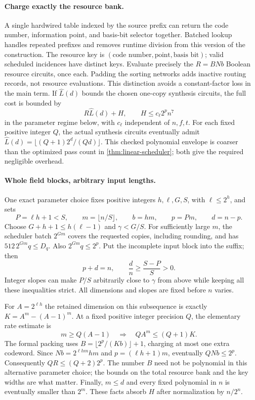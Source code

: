 \documentclass[11pt]{article}
\begin{document}
\paragraph{Charge exactly the resource bank.}
A single hardwired table indexed by the source prefix can return the code
number, information point, and basis-bit selector together.  Batched lookup
handles repeated prefixes and removes runtime division from this version of
the construction.  The resource key is
$(\text{code number},\text{point},\text{basis bit})$; valid scheduled
incidences have distinct keys.  Evaluate precisely the $R=BNb$ Boolean
resource circuits, once each.  Padding the sorting networks adds inactive
routing records, not resource evaluations.  This distinction avoids a
constant-factor loss in the main term.  If $\widehat L(d)$ bounds the chosen
one-copy synthesis circuits, the full cost is bounded by
\[
  R\widehat L(d)+H,\qquad H\le c_\ell 2^p n^7
\]
in the parameter regime below, with $c_\ell$ independent of $n,f,t$.
For each fixed positive integer $Q$, the actual synthesis circuits eventually
admit $\widehat L(d)=\lfloor(Q+1)2^d/(Qd)\rfloor$.
This checked polynomial envelope is coarser than the optimized pass count
in \cref{thm:linear-scheduler}; both give the required negligible overhead.

\paragraph{Whole field blocks, arbitrary input lengths.}
One exact parameter choice fixes positive integers $h,\ell,G,S$, with
$\ell\le2^h$, and sets
\[
  P=\ell h+1<S,\qquad
  m=\lfloor n/S\rfloor,\qquad b=hm,\qquad p=Pm,\qquad d=n-p.
\]
Choose $G+h+1\le h(\ell-1)$ and $\gamma<G/S$.
For sufficiently large $m$, the scheduler batch $2^{Gm}$ covers the requested
copies, including rounding, and has $512\,2^{Gm}q\le D_q$.
Also $2^{Gm}q\le2^p$.  Put the incomplete input block into the suffix; then
\[
  p+d=n,\qquad \frac dn\ge\frac{S-P}{S}>0.
\]
Integer slopes can make $P/S$ arbitrarily close to $\gamma$ from above
while keeping all these inequalities strict.  All dimensions and slopes
are fixed before $n$ varies.

For $A=2^{\ell h}$ the retained dimension on this subsequence is exactly
$K=A^m-(A-1)^m$.  At a fixed positive integer precision $Q$, the elementary
rate estimate is
\[
  m\ge Q(A-1)\quad\Longrightarrow\quad QA^m\le(Q+1)K.
\]
The formal packing uses $B=\lfloor2^p/(Kb)\rfloor+1$, charging at most one
extra codeword.  Since $Nb=2^{\ell hm}hm$ and $p=(\ell h+1)m$, eventually
$QNb\le2^p$.  Consequently $QR\le(Q+2)2^p$.
The number $B$ need not be polynomial in this alternative parameter choice;
the bounds on the total resource bank and the key widths are what matter.
Finally, $m\le d$ and every fixed polynomial in $n$ is eventually smaller
than $2^m$.  These facts absorb $H$ after normalization by $n/2^n$.
\end{document}
